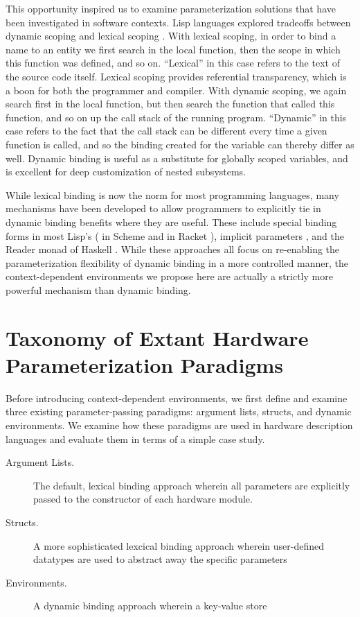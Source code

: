 This opportunity inspired us to examine parameterization solutions that have been investigated in software contexts.
Lisp languages explored tradeoffs between dynamic scoping and lexical scoping \cite{gordon}.
With lexical scoping, in order to bind a name to an entity we first search in the local function, then the scope in which this function was defined, and so on.
``Lexical'' in this case refers to the text of the source code itself.
Lexical scoping provides referential transparency, which is a boon for both the programmer and compiler.
With dynamic scoping, we again search first in the local function, but then search the function that called this function, and so on up the call stack of the running program.
``Dynamic'' in this case refers to the fact that the call stack can be different every time a given function is called, and so the binding created for the variable can thereby differ as well.
Dynamic binding is useful as a substitute for globally scoped variables, and is excellent for deep customization of nested subsystems.

While lexical binding is now the norm for most programming languages, many mechanisms have been developed to allow programmers to explicitly tie in dynamic binding benefits where they are useful.
These include special binding forms in most Lisp's ( in Scheme \cite{steele} and  in Racket \cite{flatt2013racket}), implicit parameters \cite{lewis2000implicit}, and the Reader monad of Haskell \cite{jones1995functional}.
While these approaches all focus on re-enabling the parameterization flexibility of dynamic binding in a more controlled manner, 
the context-dependent environments we propose here are actually a strictly more powerful mechanism than dynamic binding. 

\section{Taxonomy of Extant Hardware Parameterization Paradigms}
\label{sec:tax}

Before introducing context-dependent environments, we first define and examine three existing parameter-passing paradigms: argument lists, structs, and dynamic environments.
We examine how these paradigms are used in hardware description languages and evaluate them in terms of a simple case study.

\begin{description}
\item[Argument Lists.] The default, lexical binding approach wherein all parameters are explicitly passed to the constructor of each hardware module.
\item[Structs.] A more sophisticated lexcical binding approach wherein user-defined datatypes are used to abstract away the specific parameters
\item[Environments.] A dynamic binding approach wherein a key-value store
\end{description}

